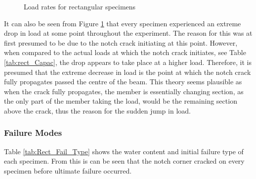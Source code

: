 \documentclass[11pt,a4paper]{article}
\numberwithin{equation}{subsection}
\begin{document}
\begin{figure}[h]
	\begin{center}
	\end{center}
	\caption{Load rates for rectangular specimens}
	\label{fig:Rect_load}
\end{figure}

\noindent
It can also be seen from Figure \ref{fig:Rect_load} that every specimen experienced an extreme drop in load at some point throughout the experiment. The reason for this was at first presumed to be due to the notch crack initiating at this point. However, when compared to the actual loads at which the notch crack initiates, see Table \ref{tab:rect_Capac}, the drop appears to take place at a higher load. Therefore, it is presumed that the extreme decrease in load is the point at which the notch crack fully propagates passed the centre of the beam. This theory seems plausible as when the crack fully propagates, the member is essentially changing section, as the only part of the member taking the load, would be the remaining section above the crack, thus the reason for the sudden jump in load.  

\subsubsection{Failure Modes}
Table \ref{tab:Rect_Fail_Type} shows the water content and initial failure type of each specimen. From this is can be seen that the notch corner cracked on every specimen before ultimate failure occurred.

\vspace*{\baselineskip}
\end{document}
